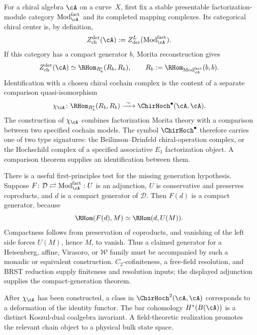 \begin{remark}
\label{rem:derived-center-chiral}
For a chiral algebra $\cA$ on a curve~$X$, first fix a stable
presentable factorization-module category
$\mathrm{Mod}^{\mathrm{fact}}_\cA$ and its completed mapping
complexes.  Its categorical chiral center is, by definition,
\[
 Z^{\mathrm{der}}_{\mathrm{ch}}(\cA)
 :=Z^{L}_{\mathrm{der}}(\mathrm{Mod}^{\mathrm{fact}}_\cA).
\]
If this category has a compact generator $b$, Morita reconstruction
gives
\[
 Z^{\mathrm{der}}_{\mathrm{ch}}(\cA)
 \simeq
 \RHom_{R_b^e}(R_b,R_b),
 \qquad
 R_b:=\RHom_{\mathrm{Mod}^{\mathrm{fact}}_\cA}(b,b).
\]
Identification with a chosen chiral cochain complex is the content of
a separate comparison quasi-isomorphism
\[
 \chi_\cA\colon
 \RHom_{R_b^e}(R_b,R_b)
 \xrightarrow{\ \sim\ }
 \ChirHoch^\bullet(\cA,\cA).
\]
The construction of $\chi_\cA$ combines factorization Morita theory
with a comparison between two specified cochain models.  The symbol
$\ChirHoch^\bullet$ therefore carries one of two type signatures: the
Beilinson--Drinfeld chiral-operation complex, or the Hochschild
complex of a specified associative $E_1$ factorization object.  A
comparison theorem supplies an identification between them.

There is a useful first-principles test for the missing generation
hypothesis.  Suppose
$F\colon\mathcal D\rightleftarrows
\mathrm{Mod}^{\mathrm{fact}}_\cA:U$ is an adjunction, $U$ is
conservative and preserves coproducts, and $d$ is a compact generator
of $\mathcal D$.  Then $F(d)$ is a compact generator, because
\[
 \RHom(F(d),M)\simeq\RHom(d,U(M)).
\]
Compactness follows from preservation of coproducts, and vanishing of
the left side forces $U(M)$, hence $M$, to vanish.  Thus a claimed
generator for a Heisenberg, affine, Virasoro, or $\mathcal W$ family
must be accompanied by such a monadic or equivalent construction.
$C_2$-cofiniteness, a free-field resolution, and BRST reduction supply
finiteness and resolution inputs; the displayed adjunction supplies
the compact-generation theorem.

After $\chi_\cA$ has been constructed, a class in
$\ChirHoch^2(\cA,\cA)$ corresponds to a deformation of the
identity functor.  The bar cohomology $H^*(B(\cA))$ is a distinct
Koszul-dual coalgebra invariant.  A field-theoretic realization
promotes the relevant chain object to a physical bulk state space.
\end{remark}

